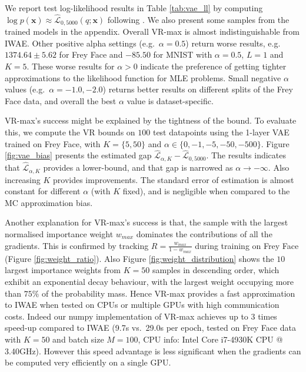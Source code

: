 We report test log-likelihood results in Table \ref{tab:vae_ll} by computing $\log p(\bm{x}) \approx \hat{\mathcal{L}}_{0, 5000}(q; \bm{x})$ following \cite{burda:iwae}. We also present some samples from the trained models in the appendix. 
%
Overall VR-max is almost indistinguishable from IWAE. Other positive alpha settings (e.g.~$\alpha = 0.5$) return worse results, e.g. $1374.64\pm5.62$ for Frey Face and $-85.50$ for MNIST with $\alpha = 0.5$, $L=1$ and $K=5$. These worse results for $\alpha > 0$ indicate the preference of getting tighter approximations to the likelihood function for MLE problems. Small negative $\alpha$ values (e.g.~$\alpha = -1.0, -2.0$) returns better results on different splits of the Frey Face data, and overall the best $\alpha$ value is dataset-specific. 

VR-max's success might be explained by the tightness of the bound. To evaluate this, we compute the VR bounds on $100$ test datapoints using the 1-layer VAE trained on Frey Face, with $K=\{5, 50\}$ and $\alpha \in \{0, -1, -5, -50, -500 \}$. Figure \ref{fig:vae_bias} presents the estimated gap $\hat{\mathcal{L}}_{\alpha, K} - \hat{\mathcal{L}}_{0, 5000}$. The results indicates that $\hat{\mathcal{L}}_{\alpha, K}$ provides a lower-bound, and that gap is narrowed as $\alpha \rightarrow -\infty$. Also increasing $K$ provides improvements. The standard error of estimation is almost constant for different $\alpha$ (with $K$ fixed), and is negligible when compared to the MC approximation bias.

%
Another explanation for VR-max's success is that, the sample with the largest normalised importance weight $w_{max}$ dominates the contributions of all the gradients.
This is confirmed by tracking $R = \frac{w_{max}}{1 - w_{max}}$ during training on Frey Face (Figure \ref{fig:weight_ratio}). Also Figure \ref{fig:weight_distribution} shows the $10$ largest importance weights from $K=50$ samples in descending order, which exhibit an exponential decay behaviour, with the largest weight occupying more than $75\%$ of the probability mass. Hence VR-max provides a fast approximation to IWAE when tested on CPUs or multiple GPUs with high communication costs. Indeed our numpy implementation of VR-max achieves up to 3 times speed-up compared to IWAE (9.7s vs.~29.0s per epoch, tested on Frey Face data with $K = 50$ and batch size $M = 100$, CPU info: Intel Core i7-4930K CPU @ 3.40GHz). However this speed advantage is less significant when the gradients can be computed very efficiently on a single GPU.